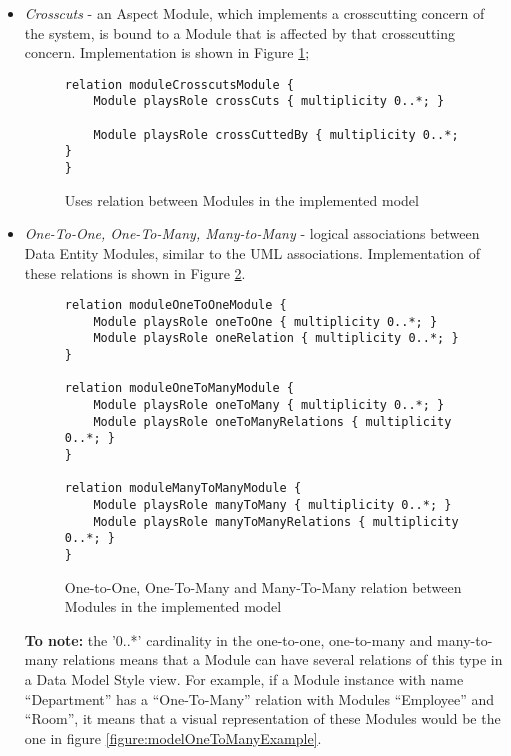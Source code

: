 \begin{itemize}
\item \textit{Crosscuts} - an Aspect Module, which implements a crosscutting concern of the system, is bound to a Module that is affected by that crosscutting concern. Implementation is shown in Figure \ref{figure:modelCrosscutsRelation};

\begin{figure}[h]
\lstset{style=customjava}
\begin{lstlisting}
relation moduleCrosscutsModule {
	Module playsRole crossCuts { multiplicity 0..*; }
	
	Module playsRole crossCuttedBy { multiplicity 0..*; }
}
\end{lstlisting}
\caption{Uses relation between Modules in the implemented model}
\label{figure:modelCrosscutsRelation}
\end{figure}

\item \textit{One-To-One, One-To-Many, Many-to-Many} - logical associations between Data Entity Modules, similar to the UML associations. Implementation of these relations is shown in Figure \ref{figure:modelDataModelRelations}.

\begin{figure}[h]
\lstset{style=customjava}
\begin{lstlisting}
relation moduleOneToOneModule {
	Module playsRole oneToOne {	multiplicity 0..*; }
	Module playsRole oneRelation { multiplicity 0..*; }
}

relation moduleOneToManyModule {
	Module playsRole oneToMany { multiplicity 0..*; }
	Module playsRole oneToManyRelations { multiplicity 0..*; }
}

relation moduleManyToManyModule {
	Module playsRole manyToMany { multiplicity 0..*; }
	Module playsRole manyToManyRelations { multiplicity 0..*; }
}
\end{lstlisting}
\caption{One-to-One, One-To-Many and Many-To-Many relation between Modules in the implemented model}
\label{figure:modelDataModelRelations}
\end{figure}

\textbf{To note:} the '0..*' cardinality in the one-to-one, one-to-many and many-to-many relations means that a Module can have several relations of this type in a Data Model Style view. For example, if a Module instance with name ``Department'' has a ``One-To-Many'' relation with Modules ``Employee'' and ``Room'', it means that a visual representation of these Modules would be the one in figure \ref{figure:modelOneToManyExample}.
\begin{figure}[h]
\centering
\renewcommand {\umltextcolor}{black}
\renewcommand {\umlfillcolor}{none}
\renewcommand {\umldrawcolor}{black}
\end{figure}
\end{itemize}
